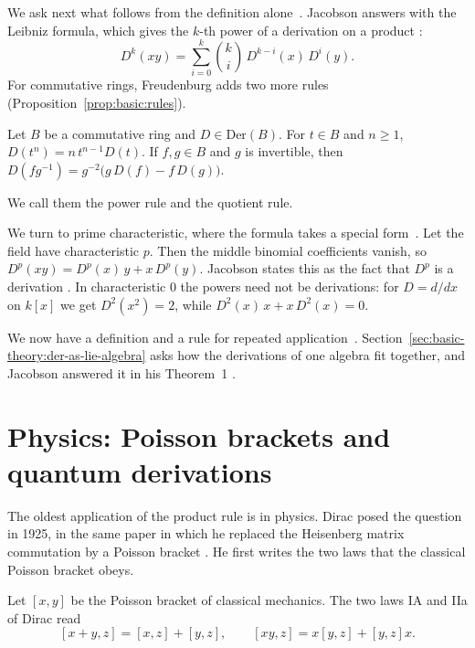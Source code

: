 We ask next what follows from the definition alone~\cite[formula~(7), p.~207]{Jacobson1937}. Jacobson answers with the
Leibniz formula, which gives the $k$-th power of a derivation on a product
\cite[formula~(7), p.~207]{Jacobson1937}:
\[
D^k(xy) = \sum_{i=0}^{k} \binom{k}{i}\, D^{k-i}(x)\, D^{i}(y).
\]
For commutative rings, Freudenburg adds two more rules (Proposition~\ref{prop:basic:rules}).

\begin{proposition}\label{prop:basic:rules}
Let $B$ be a commutative ring and $D \in \mathrm{Der}(B)$. For $t \in B$ and $n \ge 1$,
$D(t^n) = n\,t^{n-1}D(t)$. If $f, g \in B$ and $g$ is invertible, then
$D(f g^{-1}) = g^{-2}\bigl(g\,D(f) - f\,D(g)\bigr)$.
\end{proposition}

We call them the power rule and the quotient rule.

We turn to prime characteristic, where the formula takes a special form~\cite[formula~(8), p.~207]{Jacobson1937}. Let
the field have characteristic $p$. Then the middle binomial coefficients
vanish, so $D^p(xy) = D^p(x)\,y + x\,D^p(y)$. Jacobson states this as the fact
that $D^p$ is a derivation \cite[formula~(8), p.~207]{Jacobson1937}. In
characteristic $0$ the powers need not be derivations: for $D = d/dx$ on
$k[x]$ we get $D^2(x^2) = 2$, while $D^2(x)\,x + x\,D^2(x) = 0$.

We now have a definition and a rule for repeated application~\cite[p.~207]{Jacobson1937}.
Section~\ref{sec:basic-theory:der-as-lie-algebra} asks how the derivations of
one algebra fit together, and Jacobson answered it in his Theorem~1
\cite[p.~207]{Jacobson1937}.

\section{Physics: Poisson brackets and quantum derivations}\label{sec:basic-theory:physics}

The oldest application of the product rule is in physics.
Dirac posed the question
in 1925, in the same paper in which he replaced the Heisenberg matrix
commutation by a Poisson bracket \cite{Dirac1925}. He first writes the two
laws that the classical Poisson bracket obeys.

\begin{definition}\label{def:basic:dirac-poisson}
Let $[x,y]$ be the Poisson bracket of classical mechanics. The two laws
IA and IIa of Dirac read
\[
[x+y,z]=[x,z]+[y,z],\qquad [xy,z]=x[y,z]+[y,z]x .
\]
\end{definition}

